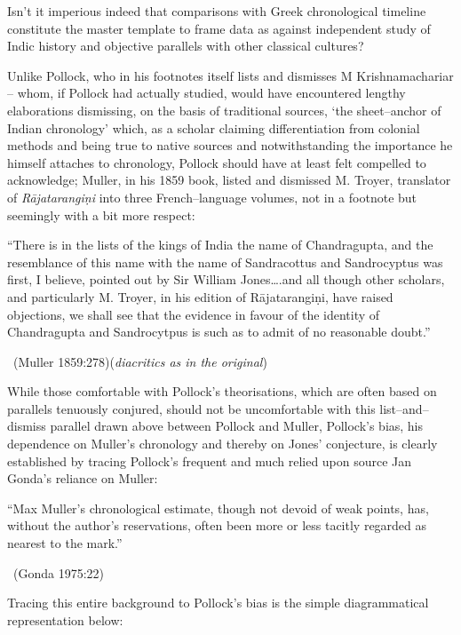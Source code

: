 Isn’t it imperious indeed that comparisons with Greek chronological timeline constitute the master template to frame data as against independent study of Indic history and objective parallels with other classical cultures?

Unlike Pollock, who in his footnotes itself lists and dismisses M Krishnamachariar – whom, if Pollock had actually studied, would have encountered lengthy elaborations dismissing, on the basis of traditional sources, ‘the sheet–anchor of Indian chronology’ which, as a scholar claiming differentiation from colonial methods and being true to native sources and notwithstanding the importance he himself attaches to chronology, Pollock should have at least felt compelled to acknowledge; Muller, in his 1859 book, listed and dismissed M. Troyer, translator of \textit{Rājatarangiṇi} into three French–language volumes, not in a footnote but seemingly with a bit more respect:

\begin{myquote}
“There is in the lists of the kings of India the name of Chandragupta, and the resemblance of this name with the name of Sandracottus and Sandrocyptus was first, I believe, pointed out by Sir William Jones….and all though other scholars, and particularly M. Troyer, in his edition of Rājatarangiṇi, have raised objections, we shall see that the evidence in favour of the identity of Chandragupta and Sandrocytpus is such as to admit of no reasonable doubt.” 

~\hfill (Muller 1859:278)(\textit{diacritics as in the original})
\end{myquote}

While those comfortable with Pollock’s theorisations, which are often based on parallels tenuously conjured, should not be uncomfortable with this list–and–dismiss parallel drawn above between Pollock and Muller, Pollock’s bias, his dependence on Muller’s chronology and thereby on Jones’ conjecture, is clearly established by tracing Pollock’s frequent and much relied upon source Jan Gonda’s reliance on Muller:

\begin{myquote}
“Max Muller’s chronological estimate, though not devoid of weak points, has, without the author’s reservations, often been more or less tacitly regarded as nearest to the mark.” 

~\hfill (Gonda 1975:22)
\end{myquote}

Tracing this entire background to Pollock’s bias is the simple diagrammatical representation below:

